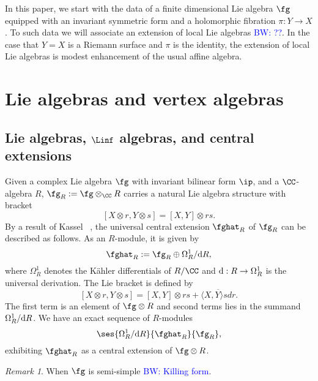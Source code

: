 \documentclass[12pt]{amsart}
\theoremstyle{definition}
\theoremstyle{remark}
\newtheorem{rmk}[theorem]{Remark}
\def\d{{\rm d}}
\def\tensor{\otimes}
\def\brian{\textcolor{blue}{BW: }\textcolor{blue}}
\begin{document}
In this paper, we start with the data of a finite dimensional Lie algebra $\fg$ equipped with an invariant symmetric form and a holomorphic fibration $\pi : Y \to X$. 
To such data we will associate an extension of local Lie algebras \brian{??}.
In the case that $Y = X$ is a Riemann surface and $\pi$ is the identity, the extension of local Lie algebras is modest enhancement of the usual affine algebra.


\section{Lie algebras and vertex algebras}
\subsection{Lie algebras, $\Linf$ algebras, and central extensions}


Given a complex Lie algebra $\fg$ with invariant bilinear form $\ip$, and a $\CC$-algebra $R$, $ \fg_{R} := \fg \otimes_{\CC} R$ carries a natural Lie algebra structure with bracket
\[
[X \otimes r, Y \otimes s] = [X,Y] \otimes rs.
\]
By a result of Kassel ~\cite{Kassel}, the universal central extension $\fghat_{R}$ of $\fg_{R}$ can be described as follows. As an $R$-module, it is given by
\begin{equation} \label{uce}
\fghat_{R} := \fg_{R} \oplus \Omega^1_{R} / \d R ,
\end{equation}
where $\Omega^1_{R}$ denotes the K\"{a}hler differentials of $R/\CC$ and $\d: R \rightarrow \Omega^{1}_{R}$ is the universal derivation.
The Lie bracket is defined by
\[
[X \otimes r, Y \otimes s] =  [X,Y] \otimes rs + \overline{\langle X, Y \rangle s dr} . 
\]
The first term is an element of $\fg \tensor R$ and second terms lies in the summand $\Omega^1_{R} / \d R$. 
We have an exact sequence of $R$-modules
\[
\ses{\Omega^1_{R} / \d R}{\fghat_{R}}{\fg_{R}},
\]
exhibiting $\fghat_R$ as a central extension of $\fg \tensor R$. 

\begin{rmk}
When $\fg$ is semi-simple \brian{Killing form}.
\end{rmk}
\end{document}
